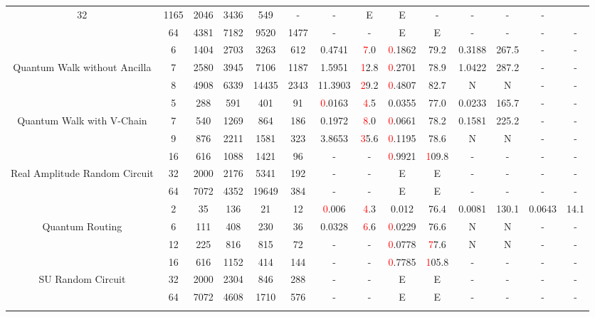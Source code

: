 \begin{table}[htb]
{\begin{tabular}{|c|c|c|c|c|c|c|c|c|c|c|c|c|c|}
32 & 1165 & 2046 & 3436 & 549
 & - & -
 & E & E
 & - & -
 & - & -
 \\
 & 
64 & 4381 & 7182 & 9520 & 1477
 & - & -
 & E & E
 & - & -
 & - & -
 \\
\hline
 & 
6 & 1404 & 2703 & 3263 & 612
 & 0.4741 & \textcolor{red}7.0
 & \textcolor{red}0.1862 & 79.2
 & 0.3188 & 267.5
 & - & -
 \\
Quantum Walk without Ancilla & 
7 & 2580 & 3945 & 7106 & 1187
 & 1.5951 & \textcolor{red}12.8
 & \textcolor{red}0.2701 & 78.9
 & 1.0422 & 287.2
 & - & -
 \\
 & 
8 & 4908 & 6339 & 14435 & 2343
 & 11.3903 & \textcolor{red}29.2
 & \textcolor{red}0.4807 & 82.7
 & N & N 
 & - & -
 \\
\hline
 & 
5 & 288 & 591 & 401 & 91
 & \textcolor{red}0.0163 & \textcolor{red}4.5
 & 0.0355 & 77.0
 & 0.0233 & 165.7
 & - & -
 \\
Quantum Walk with V-Chain & 
7 & 540 & 1269 & 864 & 186
 & 0.1972 & \textcolor{red}8.0
 & \textcolor{red}0.0661 & 78.2
 & 0.1581 & 225.2
 & - & -
 \\
 & 
9 & 876 & 2211 & 1581 & 323
 & 3.8653 & \textcolor{red}35.6
 & \textcolor{red}0.1195 & 78.6
 & N & N 
 & - & -
 \\
\hline
 & 
16 & 616 & 1088 & 1421 & 96
 & - & -
 & \textcolor{red}0.9921 & \textcolor{red}109.8
 & - & -
 & - & -
 \\
Real Amplitude Random Circuit & 
32 & 2000 & 2176 & 5341 & 192
 & - & -
 & E & E
 & - & -
 & - & -
 \\
 & 
64 & 7072 & 4352 & 19649 & 384
 & - & -
 & E & E
 & - & -
 & - & -
 \\
\hline
 & 
2 & 35 & 136 & 21 & 12
 & \textcolor{red}0.006 & \textcolor{red}4.3
 & 0.012 & 76.4
 & 0.0081 & 130.1
 & 0.0643 & 14.1
 \\
Quantum Routing & 
6 & 111 & 408 & 230 & 36
 & 0.0328 & \textcolor{red}6.6
 & \textcolor{red}0.0229 & 76.6
 & N & N 
 & - & -
 \\
 & 
12 & 225 & 816 & 815 & 72
 & - & -
 & \textcolor{red}0.0778 & \textcolor{red}77.6
 & N & N 
 & - & -
 \\
\hline
 & 
16 & 616 & 1152 & 414 & 144
 & - & -
 & \textcolor{red}0.7785 & \textcolor{red}105.8
 & - & -
 & - & -
 \\
SU Random Circuit & 
32 & 2000 & 2304 & 846 & 288
 & - & -
 & E & E
 & - & -
 & - & -
 \\
 & 
64 & 7072 & 4608 & 1710 & 576
 & - & -
 & E & E
 & - & -
 & - & -
 \\
\hline
 & 

\end{tabular}}
\end{table}
